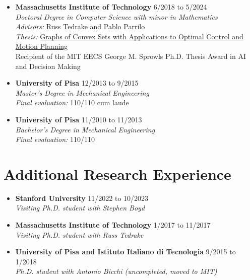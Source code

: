 \documentclass[11pt,a4paper,sans]{moderncv}
\begin{document}
\begin{itemize}

\item \textbf{Massachusetts Institute of Technology} \hfill 6/2018 to 5/2024 \\
\textit{Doctoral Degree in Computer Science with minor in Mathematics} \\
\textit{Advisors:} Russ Tedrake and Pablo Parrilo \\
\textit{Thesis:} \href{https://dspace.mit.edu/handle/1721.1/156598?show=full}{\color{cyan}Graphs of Convex Sets with Applications to Optimal Control and Motion Planning} \\
Recipient of the MIT EECS George M. Sprowls Ph.D. Thesis Award in AI and Decision Making

\item \textbf{University of Pisa} \hfill 12/2013 to 9/2015 \\
\textit{Master's Degree in Mechanical Engineering} \\
\textit{Final evaluation:} 110/110 cum laude

\item \textbf{University of Pisa} \hfill 11/2010 to 11/2013 \\
\textit{Bachelor's Degree in Mechanical Engineering} \\
\textit{Final evaluation:} 110/110
	
\end{itemize}

\section{Additional Research Experience}

\begin{itemize}

\item \textbf{Stanford University} \hfill 11/2022 to 10/2023 \\
\textit{Visiting Ph.D. student with Stephen Boyd}

\item \textbf{Massachusetts Institute of Technology} \hfill 1/2017 to 11/2017 \\
\textit{Visiting Ph.D. student with Russ Tedrake}

\item \textbf{University of Pisa and Istituto Italiano di Tecnologia} \hfill 9/2015 to 1/2018 \\
\textit{Ph.D. student with Antonio Bicchi (uncompleted, moved to MIT)}

\end{itemize}
\end{document}
